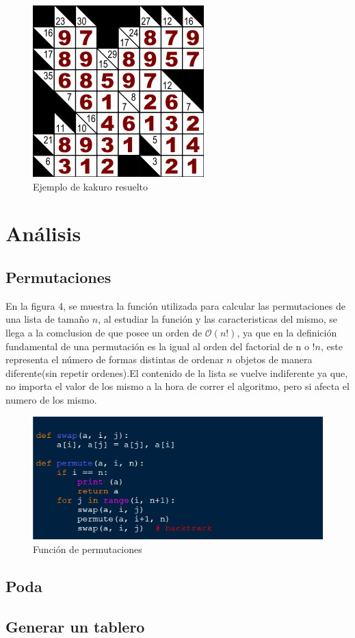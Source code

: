\documentclass[journal]{IEEEtran}
\begin{document}
\begin{figure}[h] 
        \centering \includegraphics[width=.35\columnwidth]{kakuro_solved.png}
        \caption{
                \label{fig:samplesetup}
                Ejemplo de kakuro resuelto
        }
\end{figure}

\section{Análisis}
\subsection{Permutaciones}
En la figura 4, se muestra la funci\'{o}n utilizada para calcular las permutaciones de una lista de tama\~{n}o $n$,  al estudiar la funci\'{o}n y las caracteristicas del mismo, se llega a la comclusion de que posee un orden de $\mathcal{O}(n!)$, ya que en la definici\'{o}n fundamental de una permutaci\'{o}n es la igual al orden del factorial de n o $!n$, este representa el número de formas distintas de ordenar $n$ objetos de manera diferente(sin repetir ordenes).El contenido de la lista se vuelve indiferente ya que, no importa el valor de los mismo a la hora de correr el algoritmo, pero si afecta el numero de los mismo.
\begin{figure}[hb] 
	\centering \includegraphics[width=0.9\columnwidth]{permutacion.png}
	\caption{
		\label{fig:samplesetup}
		Función de permutaciones 
	}
\end{figure} 
\subsection{Poda}
\subsection{Generar un tablero}
\end{document}
